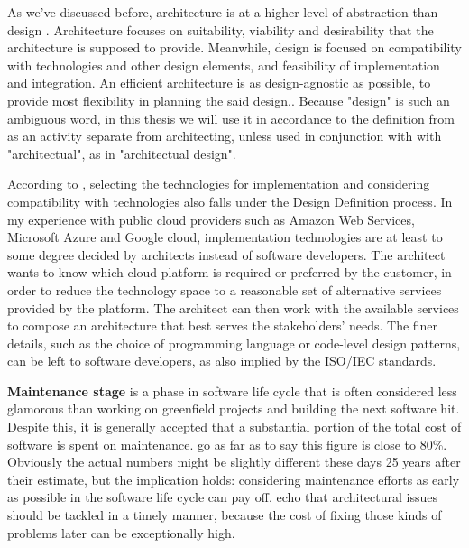 \documentclass[utf8,english]{gradu3}
\begin{document}
As we've discussed before, architecture is at a higher level of abstraction than
design \parencite{IEEE12207}. Architecture focuses on suitability, viability and
desirability that the architecture is supposed to provide. Meanwhile, design is
focused on compatibility with technologies and other design elements, and
feasibility of implementation and integration. An efficient architecture is as
design-agnostic as possible, to provide most flexibility in planning the said
design.\parencite[71]{IEEE12207}. Because "design" is such an ambiguous word, in this
thesis we will use it in accordance to the definition from \textcite{IEEE12207} as an activity
separate from architecting, unless used in conjunction with with "architectual",
as in "architectual design".

According to \textcite[71-72]{IEEE12207}, selecting the technologies for implementation
and considering compatibility with technologies also falls under the Design
Definition process. In my experience with public cloud providers such as Amazon
Web Services, Microsoft Azure and Google cloud, implementation technologies are
at least to some degree decided by architects instead of software developers.
The architect wants to know which cloud platform is required or preferred by the
customer, in order to reduce the technology space to a reasonable set of
alternative services provided by the platform. The architect can then work with
the available services to compose an architecture that best serves the
stakeholders' needs. The finer details, such as the choice of programming
language or code-level design patterns, can be left to software developers, as
also implied by the ISO/IEC standards.

\textbf{Maintenance stage} is a phase in software life cycle that is often considered
less glamorous than working on greenfield projects and building the next
software hit. Despite this, it is generally accepted that a substantial portion
of the total cost of software is spent on maintenance. \textcite[32]{Bass1998} go as far
as to say this figure is close to 80\%. Obviously the actual numbers might be
slightly different these days 25 years after their estimate, but the implication
holds: considering maintenance efforts as early as possible in the software life
cycle can pay off. \textcite[1]{Mumtaz2021} echo that architectural issues should be
tackled in a timely manner, because the cost of fixing those kinds of problems
later can be exceptionally high.
\end{document}
